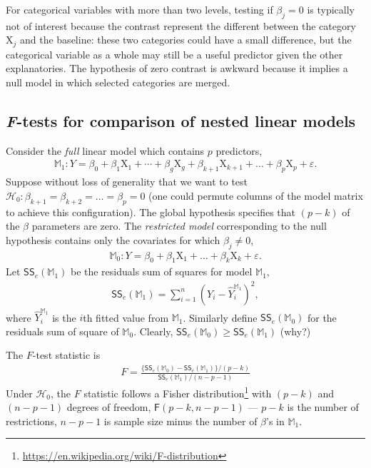 \documentclass[
  11pt,
  letterpaper,
]{book}
\renewcommand{\href}[2]{#2\footnote{\url{#1}}}
\theoremstyle{definition}
\theoremstyle{definition}
\theoremstyle{definition}
\theoremstyle{remark}
\begin{document}
For categorical variables with more than two levels, testing if \(\beta_j=0\) is typically not of interest because the contrast represent the different between the category \(\mathrm{X}_j\) and the baseline: these two categories could have a small difference, but the categorical variable as a whole may still be a useful predictor given the other explanatories. The hypothesis of zero contrast is awkward because it implies a null model in which selected categories are merged.

\hypertarget{ftestslm}{%
\subsection{\texorpdfstring{\emph{F}-tests for comparison of nested linear models}{F-tests for comparison of nested linear models}}\label{ftestslm}}

Consider the \emph{full} linear model which contains \(p\) predictors,
\begin{align*}
\mathbb{M}_1: Y=\beta_0+\beta_1 \mathrm{X}_1 + \cdots + \beta_g \mathrm{X}_g + \beta_{k+1}\mathrm{X}_{k+1} + \ldots + \beta_p \mathrm{X}_p + \varepsilon.
\end{align*}
Suppose without loss of generality that we want to test \(\mathscr{H}_0: \beta_{k+1}=\beta_{k+2}=\ldots=\beta_p=0\) (one could permute columns of the model matrix to achieve this configuration).
The global hypothesis specifies that \((p-k)\) of the \(\beta\) parameters are zero. The \emph{restricted model} corresponding to the null hypothesis contains only the covariates for which \(\beta_j \neq 0\),
\begin{align*}
\mathbb{M}_0: Y=\beta_0+\beta_1 \mathrm{X}_1 + \ldots + \beta_k \mathrm{X}_k + \varepsilon.
\end{align*}
Let \(\mathsf{SS}_e(\mathbb{M}_1)\) be the residuals sum of squares for model \(\mathbb{M}_1\),
\begin{align*}
\mathsf{SS}_e(\mathbb{M}_1)=\sum_{i=1}^n (Y_i-\widehat{Y}_i^{\mathbb{M}_1})^2,
\end{align*}
where \(\widehat{Y}_i^{\mathbb{M}_1}\) is the \(i\)th fitted value from \(\mathbb{M}_1\). Similarly define \(\mathsf{SS}_e(\mathbb{M}_0)\) for the residuals sum of square of \(\mathbb{M}_0\). Clearly, \(\mathsf{SS}_e(\mathbb{M}_0) \geq \mathsf{SS}_e(\mathbb{M}_1)\) (why?)

The \(F\)-test statistic is
\begin{align*}
F=\frac{\{\mathsf{SS}_e(\mathbb{M}_0)-\mathsf{SS}_e(\mathbb{M}_1)\}/(p-k)}{\mathsf{SS}_e(\mathbb{M}_1)/(n-p-1)}
\end{align*}
Under \(\mathscr{H}_0\), the \(F\) statistic follows a \href{https://en.wikipedia.org/wiki/F-distribution}{Fisher distribution} with \((p-k)\) and \((n-p-1)\) degrees of freedom, \(\mathsf{F}(p-k, n-p-1)\) --- \(p-k\) is the number of restrictions, \(n-p-1\) is sample size minus the number of \(\beta\)'s in \(\mathbb{M}_1\).
\end{document}
